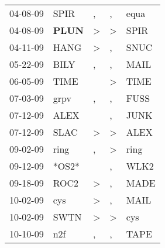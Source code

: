 \begin{supertabular}{p{0.07\textwidth}p{0.06\textwidth}p{0.02\textwidth}p{0.02\textwidth}p{0.06\textwidth}}
          04-08-09\textsuperscript{} &           SPIR\textsuperscript{} &                , &                , &           equa\textsuperscript{} \\
          04-08-09\textsuperscript{} &  \textbf{PLUN\textsuperscript{}} &     \textgreater &     \textgreater &           SPIR\textsuperscript{} \\
          04-11-09\textsuperscript{} &           HANG\textsuperscript{} &     \textgreater &                , &           SNUC\textsuperscript{} \\
          05-22-09\textsuperscript{} &           BILY\textsuperscript{} &                , &                , &           MAIL\textsuperscript{} \\
          06-05-09\textsuperscript{} &           TIME\textsuperscript{} &                  &     \textgreater &           TIME\textsuperscript{} \\
          07-03-09\textsuperscript{} &           grpv\textsuperscript{} &                , &                , &           FUSS\textsuperscript{} \\
          07-12-09\textsuperscript{} &           ALEX\textsuperscript{} &                  &                , &           JUNK\textsuperscript{} \\
          07-12-09\textsuperscript{} &           SLAC\textsuperscript{} &     \textgreater &     \textgreater &           ALEX\textsuperscript{} \\
          09-02-09\textsuperscript{} &           ring\textsuperscript{} &                , &     \textgreater &           ring\textsuperscript{} \\
          09-12-09\textsuperscript{} &                            *OS2* &                  &                , &           WLK2\textsuperscript{} \\
          09-18-09\textsuperscript{} &           ROC2\textsuperscript{} &     \textgreater &                , &           MADE\textsuperscript{} \\
          10-02-09\textsuperscript{} &            cys\textsuperscript{} &     \textgreater &                , &           MAIL\textsuperscript{} \\
          10-02-09\textsuperscript{} &           SWTN\textsuperscript{} &     \textgreater &     \textgreater &            cys\textsuperscript{} \\
          10-10-09\textsuperscript{} &            n2f\textsuperscript{} &                , &                , &           TAPE\textsuperscript{} \\

\end{supertabular}
